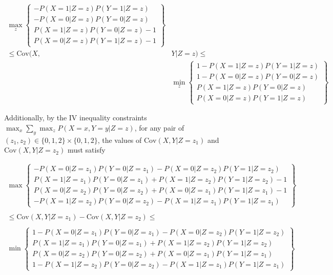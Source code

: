 \documentclass[
]{article}
\theoremstyle{plain}
\begin{document}
\[
\begin{aligned}
  \max_z\left\{
      \begin{array}{c}
        -P(X = 1 | Z = z)P(Y = 1 | Z = z) \\
        -P(X = 0 | Z = z)P(Y = 0 | Z = z) \\
        P(X = 1 | Z = z)P(Y = 0 | Z = z) - 1\\
        P(X = 0 | Z = z)P(Y = 1 | Z = z) - 1
      \end{array}
    \right\} & \\
    \le \text{Cov}(X, &Y | Z = z) \le \\
    &\min_z\left\{
      \begin{array}{c}
        1 - P(X = 1 | Z = z)P(Y = 1 | Z = z) \\
        1 - P(X = 0 | Z = z)P(Y = 0 | Z = z) \\
        P(X = 1 | Z = z)P(Y = 0 | Z = z) \\
        P(X = 0 | Z = z)P(Y = 1 | Z = z)
      \end{array}
    \right\}
\end{aligned}
\]

Additionally, by the IV inequality constraints \(\max_x \sum_y \max_z P(X = x, Y = y | Z = z)\), for any pair of \((z_1, z_2) \in \{0,1,2\} \times \{0,1,2\}\), the values of \(\text{Cov}(X, Y | Z = z_1)\) and \(\text{Cov}(X, Y | Z = z_2)\) must satisfy

\[
\begin{aligned}
  \max\left\{
      \begin{array}{c}
        -P(X = 0 | Z = z_1)P(Y = 0 | Z = z_1) - P(X = 0 | Z = z_2)P(Y = 1 | Z = z_2) \\
        P(X = 1 | Z = z_1)P(Y = 0 | Z = z_1) + P(X = 1 | Z = z_2)P(Y = 1 | Z = z_2) -1 \\
        P(X = 0 | Z = z_2)P(Y = 0 | Z = z_2) + P(X = 0 | Z = z_1)P(Y = 1 | Z = z_1) - 1 \\
        -P(X = 1 | Z = z_2)P(Y = 0 | Z = z_2) - P(X = 1 | Z = z_1)P(Y = 1 | Z = z_1)
      \end{array}
    \right\} \qquad \qquad & \\ \\
    \le \text{Cov}(X,Y | Z = z_1) - \text{Cov}(X,Y | Z = z_2) \le \qquad \qquad \qquad \qquad  \qquad& \\ \\
    \min\left\{
      \begin{array}{c}
        1 -P(X = 0 | Z = z_1)P(Y = 0 | Z = z_1) - P(X = 0 | Z = z_2)P(Y = 1 | Z = z_2) \\
        P(X = 1 | Z = z_1)P(Y = 0 | Z = z_1) + P(X = 1 | Z = z_2)P(Y = 1 | Z = z_2) \\
        P(X = 0 | Z = z_2)P(Y = 0 | Z = z_2) + P(X = 0 | Z = z_1)P(Y = 1 | Z = z_1) \\
        1 - P(X = 1 | Z = z_2)P(Y = 0 | Z = z_2) - P(X = 1 | Z = z_1)P(Y = 1 | Z = z_1)
      \end{array}
    \right\} &
\end{aligned}
\]
\end{document}
